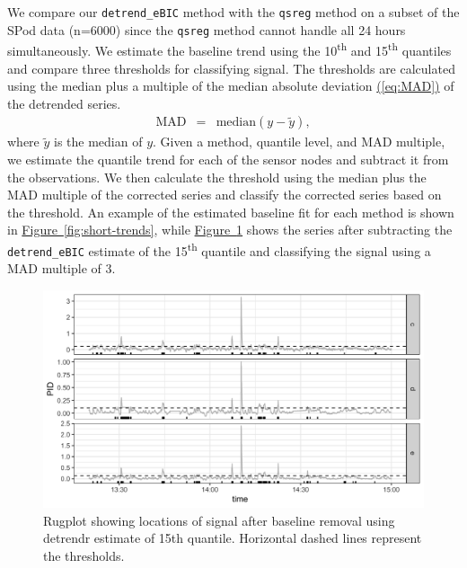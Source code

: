 \documentclass[12pt]{article}
\newcommand{\Eqn}[1]{\hyperref[eq:#1]{{\rm (\ref*{eq:#1})}}} %
\newcommand{\Fig}[1]{\hyperref[fig:#1]{Figure~\ref*{fig:#1}}} %
\newcommand{\Eqn}[1]{{(\ref{eq:#1})}} %
\newcommand{\Fig}[1]{{Figure~\ref{fig:#1}}} %
\begin{document}
	We compare our \texttt{detrend\_eBIC} method with the \texttt{qsreg} method on a subset of the SPod data (n=6000) since the \texttt{qsreg} method cannot handle all 24 hours simultaneously. We estimate the baseline trend using the 10\textsuperscript{th} and 15\textsuperscript{th} quantiles and compare three thresholds for classifying signal. The thresholds are calculated using the median plus a multiple of the median absolute deviation \Eqn{MAD} of the detrended series. 
	\begin{eqnarray}
	\label{eq:MAD}
	\mbox{MAD} & = & \mbox{median}(y-\tilde{y}),
	\end{eqnarray}
	where $\tilde{y}$ is the median of $y$. Given a method, quantile level, and MAD multiple, we estimate the quantile trend for each of the sensor nodes and subtract it from the observations. We then calculate the threshold using the median plus the MAD multiple of the corrected series and classify the corrected series based on the threshold. An example of the estimated baseline fit for each method is shown in \Fig{short-trends}, while \Fig{rugplot} shows the series after subtracting the \texttt{detrend\_eBIC} estimate of the 15\textsuperscript{th} quantile and classifying the signal using a MAD multiple of 3. 
	 
 	\begin{figure}
	 	\includegraphics[width = \linewidth]{Figures/corrected_rugplot.png}
	 	\caption{Rugplot showing locations of signal after baseline removal using detrendr estimate of 15th quantile. Horizontal dashed lines represent the thresholds.}		
	 	\label{fig:rugplot}
	 \end{figure}
	 
\end{document}
